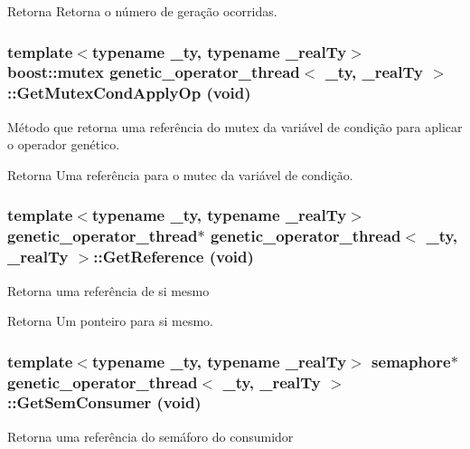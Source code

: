 \begin{DoxyReturn}{Retorna}
Retorna o número de geração ocorridas. 
\end{DoxyReturn}
\hypertarget{classgenetic__operator__thread_a0973b32bc54f444ca7afcdcdfef9a38a}{
\subsubsection[{GetMutexCondApplyOp}]{\setlength{\rightskip}{0pt plus 5cm}template$<$typename \_\-ty, typename \_\-realTy$>$ boost::mutex {\bf genetic\_\-operator\_\-thread}$<$ \_\-ty, \_\-realTy $>$::GetMutexCondApplyOp (void)}}
\label{classgenetic__operator__thread_a0973b32bc54f444ca7afcdcdfef9a38a}
Método que retorna uma referência do mutex da variável de condição para aplicar o operador genético.

\begin{DoxyReturn}{Retorna}
Uma referência para o mutec da variável de condição. 
\end{DoxyReturn}
\hypertarget{classgenetic__operator__thread_a751c7f678d7486bee8b1a02bb9e60416}{
\subsubsection[{GetReference}]{\setlength{\rightskip}{0pt plus 5cm}template$<$typename \_\-ty, typename \_\-realTy$>$ {\bf genetic\_\-operator\_\-thread}$\ast$ {\bf genetic\_\-operator\_\-thread}$<$ \_\-ty, \_\-realTy $>$::GetReference (void)}}
\label{classgenetic__operator__thread_a751c7f678d7486bee8b1a02bb9e60416}
Retorna uma referência de si mesmo

\begin{DoxyReturn}{Retorna}
Um ponteiro para si mesmo. 
\end{DoxyReturn}
\hypertarget{classgenetic__operator__thread_a73424d811348f5a911da3744dfc08762}{
\subsubsection[{GetSemConsumer}]{\setlength{\rightskip}{0pt plus 5cm}template$<$typename \_\-ty, typename \_\-realTy$>$ {\bf semaphore}$\ast$ {\bf genetic\_\-operator\_\-thread}$<$ \_\-ty, \_\-realTy $>$::GetSemConsumer (void)}}
\label{classgenetic__operator__thread_a73424d811348f5a911da3744dfc08762}
Retorna uma referência do semáforo do consumidor

